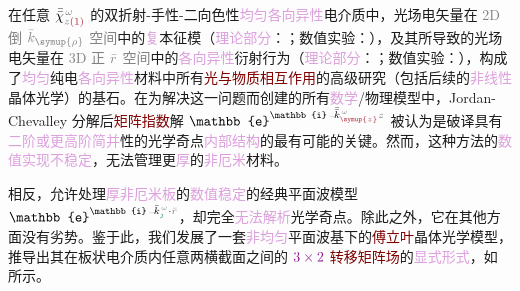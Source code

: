 在任意 $\bar{\bar{\chi}}^{\;\! \mathcolor{gray}{\omega}}_{\mathcolor{gray}{z} \textcolor{Maroon}{(1)}}$ 的\textcolor{NavyBlue}{双折射}-\textcolor{NavyBlue}{手性}-\textcolor{NavyBlue}{二向色性}\textcolor{Plum}{均匀}\textcolor{Plum}{各向异性}电介质中，\textcolor{PineGreen}{光场电矢量}在 \textcolor{gray}{2D 倒} $\mathcolor{gray}{\bar{k}_{\symup{\rho}}}$ \textcolor{gray}{空间}中的\textcolor{Plum}{复}\textcolor{PineGreen}{本征模}（\textcolor{Plum}{理论部分}：；\textcolor{NavyBlue}{数值实验}：），及其所导致的\textcolor{PineGreen}{光场电矢量}在 \textcolor{gray}{3D 正} $\mathcolor{gray}{\bar{r}}$ \textcolor{gray}{空间}中的\textcolor{Plum}{各向异性}衍射行为（\textcolor{Plum}{理论部分}：；\textcolor{NavyBlue}{数值实验}：），构成了\textcolor{Plum}{均匀}纯电\textcolor{Plum}{各向异性}材料中所有\textcolor{Maroon}{光与物质相互作用}的高级研究（包括后续的\textcolor{Plum}{非线性}\textcolor{PineGreen}{晶体光学}）的基石。在为解决这一问题而创建的所有\textcolor{Plum}{数学}/\textcolor{NavyBlue}{物理模型}中，\textcolor{PineGreen}{Jordan-Chevalley 分解}后\textcolor{Maroon}{矩阵指数}解 $\mathbb{e}^{\mathbb{i} \xint{\begin{smallmatrix} ~ \\ {}^{}_{\mathcolor{gray}{-}} \\ ~ \end{smallmatrix}}{15}{\bar{\bar{k}}}_{\textcolor{Maroon}{\symup{z}}}^{\;\! \mathcolor{gray}{\omega}} \mathcolor{gray}{z}}$ 被认为是破译具有\textcolor{Plum}{二阶或更高阶简并}性的\textcolor{PineGreen}{光学奇点}\textcolor{Plum}{内部结构}的最有可能的关键。然而，这种方法的\textcolor{Plum}{数值实现不稳定}，无法管理更\textcolor{Plum}{厚}的\textcolor{Plum}{非厄米}材料。

相反，允许处理\textcolor{Plum}{厚非厄米板}的\textcolor{Plum}{数值稳定}的\textcolor{PineGreen}{经典平面波}模型 $\mathbb{e}^{\mathbb{i} \xint{\begin{smallmatrix} ~ \\ {}^{}_{\mathcolor{gray}{-}} \\ ~ \end{smallmatrix}}{15}{\bar{k}}^{\;\! \mathcolor{gray}{\omega}}_{\textcolor{PineGreen}{\jmath}} \cdot \textcolor{gray}{\bar{r}}}$，却完全\textcolor{Plum}{无法解析}\textcolor{PineGreen}{光学奇点}。除此之外，它在其他方面没有劣势。鉴于此，我们发展了一套\textcolor{Plum}{非均匀}\textcolor{PineGreen}{平面波基}下的\textcolor{Maroon}{傅立叶}\textcolor{PineGreen}{晶体光学}模型\cite{xieAnalytic3DVector}，推导出其在板状电介质内任意两横截面之间的 $\textcolor{Plum}{3 \times 2}$ \textcolor{Maroon}{转移矩阵场}的\textcolor{Plum}{显式形式}，如  所示。

